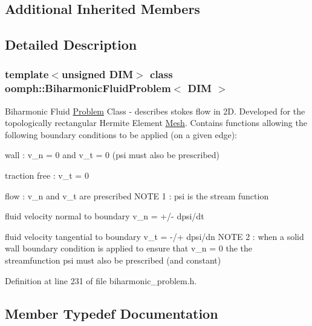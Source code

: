 \subsection*{Additional Inherited Members}


\subsection{Detailed Description}
\subsubsection*{template$<$unsigned D\+IM$>$\newline
class oomph\+::\+Biharmonic\+Fluid\+Problem$<$ D\+I\+M $>$}

Biharmonic Fluid \hyperlink{classoomph_1_1Problem}{Problem} Class -\/ describes stokes flow in 2D. Developed for the topologically rectangular Hermite Element \hyperlink{classoomph_1_1Mesh}{Mesh}. Contains functions allowing the following boundary conditions to be applied (on a given edge)\+: 


\begin{DoxyItemize}
\item wall \+: v\+\_\+n = 0 and v\+\_\+t = 0 (psi must also be prescribed)
\item traction free \+: v\+\_\+t = 0
\item flow \+: v\+\_\+n and v\+\_\+t are prescribed N\+O\+TE 1 \+: psi is the stream function
\begin{DoxyItemize}
\item fluid velocity normal to boundary v\+\_\+n = +/-\/ dpsi/dt
\item fluid velocity tangential to boundary v\+\_\+t = -\//+ dpsi/dn N\+O\+TE 2 \+: when a solid wall boundary condition is applied to ensure that v\+\_\+n = 0 the the streamfunction psi must also be prescribed (and constant) 
\end{DoxyItemize}
\end{DoxyItemize}

Definition at line 231 of file biharmonic\+\_\+problem.\+h.



\subsection{Member Typedef Documentation}
\mbox{\label{classoomph_1_1BiharmonicFluidProblem_a93661d3b0c52bd82fd58496f9f853079}} 
